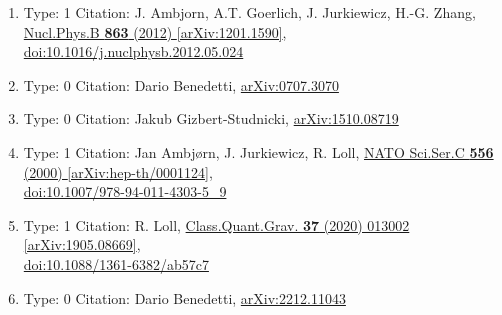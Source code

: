 \documentclass[a4paper,10pt]{article}
\begin{document}
\begin{enumerate}
\begin{enumerate}
  \item Type: 1 Citation: J. Ambjorn, A.T. Goerlich, J. Jurkiewicz, H.-G. Zhang, \href{https://www.doi.org/10.1016/j.nuclphysb.2012.05.024}{Nucl.Phys.B {\bf 863} (2012) }  \href{https://arxiv.org/abs/1201.1590}{[arXiv:1201.1590]},\\\href{https://www.doi.org/10.1016/j.nuclphysb.2012.05.024}{doi:10.1016/j.nuclphysb.2012.05.024}
  \item Type: 0 Citation: Dario Benedetti, \href{https://arxiv.org/abs/0707.3070}{arXiv:0707.3070}
  \item Type: 0 Citation: Jakub Gizbert-Studnicki, \href{https://arxiv.org/abs/1510.08719}{arXiv:1510.08719}
  \item Type: 1 Citation: Jan Ambjørn, J. Jurkiewicz, R. Loll, \href{https://www.doi.org/10.1007/978-94-011-4303-5_9}{NATO Sci.Ser.C {\bf 556} (2000) }  \href{https://arxiv.org/abs/hep-th/0001124}{[arXiv:hep-th/0001124]},\\\href{https://www.doi.org/10.1007/978-94-011-4303-5_9}{doi:10.1007/978-94-011-4303-5\_9}
  \item Type: 1 Citation: R. Loll, \href{https://www.doi.org/10.1088/1361-6382/ab57c7}{Class.Quant.Grav. {\bf 37} (2020) 013002}  \href{https://arxiv.org/abs/1905.08669}{[arXiv:1905.08669]},\\\href{https://www.doi.org/10.1088/1361-6382/ab57c7}{doi:10.1088/1361-6382/ab57c7}
  \item Type: 0 Citation: Dario Benedetti, \href{https://arxiv.org/abs/2212.11043}{arXiv:2212.11043}

\end{enumerate}
\end{enumerate}
\end{document}
